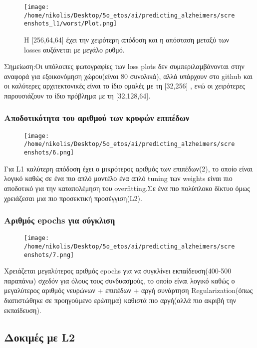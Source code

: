 \documentclass[a4paper,11pt]{article}
\begin{document}
    \begin{figure}[H]
        \centering
        \texttt{[image: /home/nikolis/Desktop/5o\_etos/ai/predicting\_alzheimers/screenshots\_l1/worst/Plot.png]}
        \label{fig:double}
        \caption{Η [256,64,64] έχει την χειρότερη απόδοση και η απόσταση μεταξύ των losses αυξάνεται με μεγάλο ρυθμό. }
    \end{figure}  

Σημείωση:Οι υπόλοιπες φωτογραφίες των loss plots δεν συμπεριλαμβάνονται στην αναφορά για εξοικονόμηση χώρου(είναι 80 συνολικά), αλλά υπάρχουν στο github
και οι καλύτερες αρχιτεκτονικές είναι το ίδιο ομαλές με τη [32,256] , ενώ οι χειρότερες παρουσιάζουν το ίδιο πρόβλημα με τη [32,128,64].


\subsubsection{Αποδοτικότητα του αριθμού των κρυφών επιπέδων}

\begin{figure}[H]
    \centering
    \texttt{[image: /home/nikolis/Desktop/5o\_etos/ai/predicting\_alzheimers/screenshots/6.png]}
    \label{fig:double}
\end{figure}

Για L1 καλύτερη απόδοση έχει ο μικρότερος αριθμός των επιπέδων(2), το οποίο είναι λογικό καθώς σε  ένα πιο απλό μοντέλο
ένα απλό tuning των weights είναι πιο αποδοτικό για την καταπολέμηση του overfitting.Σε ένα πιο πολύπλοκο δίκτυο όμως 
χρειάζεσαι μια πιο προσεκτική προσέγγιση(L2).


\subsubsection{Αριθμός epochs για σύγκλιση}


\begin{figure}[H]
    \centering
    \texttt{[image: /home/nikolis/Desktop/5o\_etos/ai/predicting\_alzheimers/screenshots/7.png]}
    \label{fig:double}
\end{figure}

Χρειάζεται μεγαλύτερος αριθμός epochs για να συγκλίνει εκπαίδευση(400-500 παραπάνω) σχεδόν για όλους τους συνδυασμούς, το οποίο είναι
λογικό καθώς ο μεγαλύτερος αριθμός νευρώνων + επιπέδων + αργή συνάρτηση Regularization(όπως διαπιστώθηκε σε προηγούμενο ερώτημα) 
καθιστά πιο αργή(αλλά πιο ακριβή την εκπαίδευση).


\subsection{Δοκιμές με L2}
\end{document}
